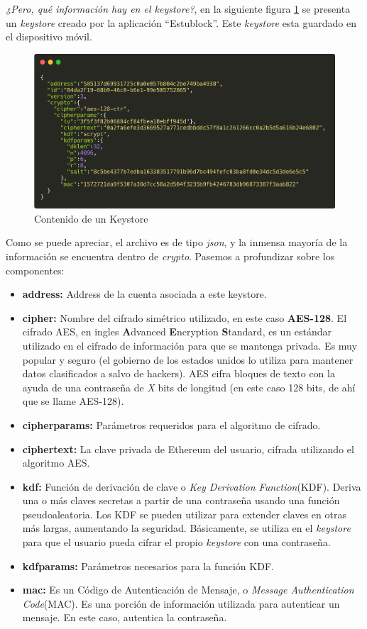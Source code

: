 \emph{¿Pero, qué información hay en el keystore?}, en la siguiente figura \ref{fig:keystore} se presenta un \emph{keystore} creado por la aplicación ``Estublock''. Este \emph{keystore} esta guardado en el dispositivo móvil. \\
\begin{figure}[h!]
  \centering
  \includegraphics[width=0.8\linewidth]{figs/Desarrollo/Keystore/keystore}
  \caption[Contenido de un Keystore]{Contenido de un Keystore}
  \label{fig:keystore}
\end{figure}

Como se puede apreciar, el archivo es de tipo \emph{json}, y la inmensa mayoría de la información se encuentra dentro de \emph{crypto}. Pasemos a profundizar sobre los componentes:
\begin{itemize}
\item \textbf{address:} Address de la cuenta asociada a este keystore.
\item \textbf{cipher:} Nombre del cifrado simétrico utilizado, en este caso \textbf{AES-128}\cite{aes_128}. El cifrado AES, en ingles \textbf{A}dvanced \textbf{E}ncryption \textbf{S}tandard, es un estándar utilizado en el cifrado de información para que se mantenga privada. Es muy popular y seguro (el gobierno de los estados unidos lo utiliza para mantener datos clasificados a salvo de hackers). AES cifra bloques de texto con la ayuda de una contraseña de \emph{X} bits de longitud (en este caso 128 bits, de ahí que se llame AES-128). 
\item \textbf{cipherparams:} Parámetros requeridos para el algoritmo de cifrado.
\item \textbf{ciphertext:} La clave privada de Ethereum del usuario, cifrada utilizando el algoritmo AES.
\item \textbf{kdf:} Función de derivación de clave o \emph{Key Derivation Function}(KDF)\cite{kdf}. Deriva una o más claves secretas a partir de una contraseña usando una función pseudoaleatoria. Los KDF se pueden utilizar para extender claves en otras más largas, aumentando la seguridad. Básicamente, se utiliza en el \emph{keystore} para que el usuario pueda cifrar el propio \emph{keystore} con una contraseña.
\item \textbf{kdfparams:} Parámetros necesarios para la función KDF.
\item \textbf{mac:} Es un Código de Autenticación de Mensaje, o \emph{Message Authentication Code}(MAC)\cite{mac}. Es una porción de información utilizada para autenticar un mensaje. En este caso, autentica la contraseña.
\end{itemize}


